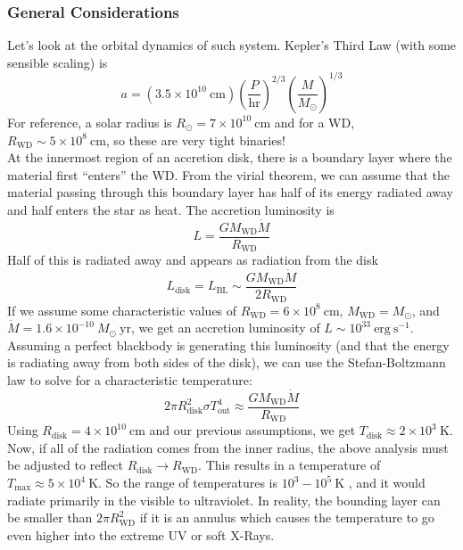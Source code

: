 \documentclass[10pt]{article}
\numberwithin{equation}{section}
\newcommand{\n}{\noindent}
\begin{document}
	\subsubsection{General Considerations} %
	\label{ssub:general_considerations}
	\n Let's look at the orbital dynamics of such system. Kepler's Third Law (with some sensible scaling) is
	\begin{equation}
		\label{eq:cv:3} a = \left(3.5\times 10^{10}\ \mathrm{cm}\right)\left(\frac{P}{\mathrm{hr}}\right)^{2/3} \left(\frac{M}{M_\odot}\right)^{1/3}
	\end{equation}
	For reference, a solar radius is $R_\odot = 7\times 10^{10}\ \mathrm{cm}$ and for a WD, $R_{\mathrm{WD}}\sim 5\times 10^{8}\ \mathrm{cm}$, so these are very tight binaries!\\
	
	\n At the innermost region of an accretion disk, there is a boundary layer where the material first ``enters'' the WD. From the virial theorem, we can assume that the material passing through this boundary layer has half of its energy radiated away and half enters the star as heat. The accretion luminosity is
	\begin{equation}
		\label{eq:cv:4} L = \frac{GM_{\mathrm{WD}}\dot{M}}{R_{\mathrm{WD}}}
	\end{equation}	
	Half of this is radiated away and appears as radiation from the disk
	\begin{equation}
		\label{eq:cv:5} L_{\mathrm{disk}} = L_{\mathrm{BL}} \sim \frac{GM_{\mathrm{WD}}\dot{M}}{2 R_{\mathrm{WD}}}
	\end{equation}
	If we assume some characteristic values of $R_{\mathrm{WD}}=6\times 10^{8}\ \mathrm{cm}$, $M_{\mathrm{WD}}= M_\odot$, and $\dot{M} = 1.6\times 10^{-10}\ M_\odot\ \mathrm{yr}$, we get an accretion luminosity of $L\sim 10^{33}\ \mathrm{erg\ s^{-1}}$. Assuming a perfect blackbody is generating this luminosity (and that the energy is radiating away from both sides of the disk), we can use the Stefan-Boltzmann law to solve for a characteristic temperature:
	\begin{equation}
		\label{eq:cv:6} 2\pi R_{\mathrm{disk}}^2\sigma T_{\mathrm{out}}^4 \approx \frac{GM_{\mathrm{WD}}\dot{M}}{ R_{\mathrm{WD}} }
	\end{equation}
	Using $R_{\mathrm{disk}}=4\times 10^{10}\ \mathrm{cm}$ and our previous assumptions, we get $T_{\mathrm{disk}}\approx 2\times 10^3\ \mathrm{K}$.\\
	
	\n Now, if all of the radiation comes from the inner radius, the above analysis must be adjusted to reflect $R_{\mathrm{disk}}\to R_{\mathrm{WD}}$. This results in a temperature of $T_{\mathrm{max}}\approx 5\times 10^4\ \mathrm{K}$. So the range of temperatures is $10^3-10^5\ \mathrm{K}$ , and it would radiate primarily in the visible to ultraviolet. In reality, the bounding layer can be smaller than $2\pi R_{\mathrm{WD}}^2$ if it is an annulus which causes the temperature to go even higher into the extreme UV or soft X-Rays.\\
	
\end{document}
